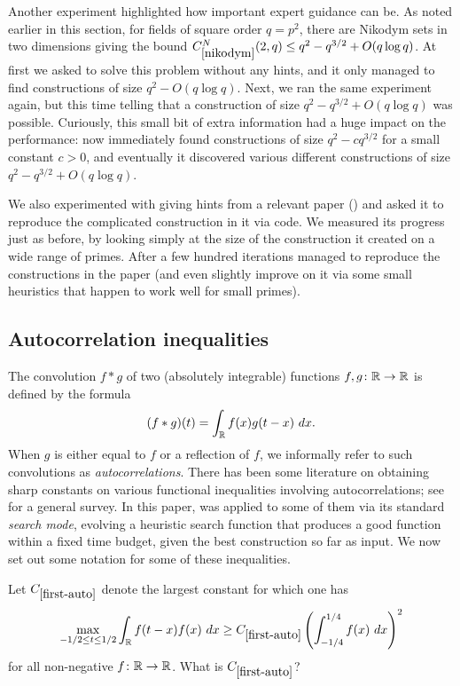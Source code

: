 Another experiment  highlighted how important expert guidance can be. As noted earlier in this section, for fields of square order $q=p^2$, there are Nikodym sets in two dimensions giving the bound $C^N_{\ref{nikodym}}(2,q) \leq q^2 - q^{3/2} + O(q \log q)$. At first we asked \AlphaEvolve to solve this problem without any hints, and it only managed to find constructions of size $q^2 - O(q\log q)$. Next, we ran the same experiment again, but this time telling \AlphaEvolve that a construction of size $q^2 - q^{3/2} + O(q \log q)$ was possible. Curiously, this small bit of extra information had a huge impact on the performance: \AlphaEvolve now immediately found constructions of size $q^2 - c q^{3/2}$ for a small constant $c>0$, and eventually it discovered various different constructions of size $q^2 - q^{3/2} + O(q \log q)$. 

We also experimented with giving \AlphaEvolve hints from a relevant paper (\cite{szonyi}) and asked it to reproduce the complicated construction in it via code. We measured its progress just as before, by looking simply at the size of the construction it created on a wide range of primes. After a few hundred iterations \AlphaEvolve managed to reproduce the constructions in the paper (and even slightly improve on it via some small heuristics that happen to work well for small primes).


\subsection{Autocorrelation inequalities}


The convolution $f*g$ of two (absolutely integrable) functions $f,g \colon \mathbb{R} \to \mathbb{R}$ is defined by the formula
$$ (f*g)(t) = \int_{\mathbb{R}} f(x) g(t-x)\ dx.$$
When $g$ is either equal to $f$ or a reflection of $f$, we informally refer to such convolutions as \emph{autocorrelations}.  There has been some literature on obtaining sharp constants on various functional inequalities involving autocorrelations; see \cite{pont-madrid} for a general survey. In this paper, \AlphaEvolve was applied to some of them via its standard \emph{search mode}, evolving a heuristic search function that produces a good function within a fixed time budget, given the best construction so far as input. 
We now set out some notation for some of these inequalities.

\renewcommand{\problemURL}{https://google-deepmind.github.io/alphaevolve_repository_of_problems/problems/2.html}

\begin{problem}\label{first-auto}
Let $C_{\ref{first-auto}}$ denote the largest constant for which one has
\begin{equation}\label{maxf}
 \max_{-1/2 \leq t \leq 1/2} \int_{\mathbb{R}} f(t-x) f(x)\ dx \geq C_{\ref{first-auto}} \left(\int_{-1/4}^{1/4} f(x)\ dx\right)^2
\end{equation}
for all non-negative $f \colon \mathbb{R} \to \mathbb{R}$. What is $C_{\ref{first-auto}}$?
\end{problem}

